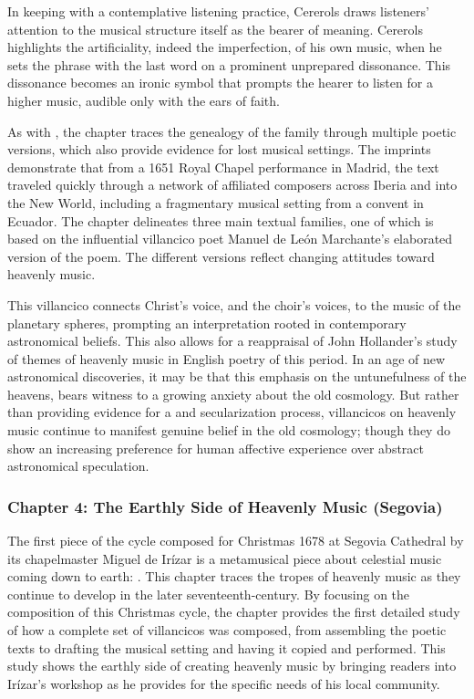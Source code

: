 \documentclass{vcbook-proposal}
\begin{document}
In keeping with a contemplative listening practice, Cererols draws listeners'
attention to the musical structure itself as the bearer of meaning.
Cererols highlights the artificiality, indeed the imperfection, of his own 
music, when he sets the phrase  with 
the last word on a prominent unprepared dissonance.
This dissonance becomes an ironic symbol that prompts the hearer to listen for 
a higher music, audible only with the ears of faith.

As with , the chapter traces the genealogy of the
 family through multiple poetic versions, which
also provide evidence for lost musical settings.
The imprints demonstrate that from a 1651 Royal Chapel performance in Madrid, 
the text traveled quickly through a network of affiliated composers across 
Iberia and into the New World, including a fragmentary musical setting from a 
convent in Ecuador.
The chapter delineates three main textual families, one of which is based on 
the influential villancico poet Manuel de León Marchante's elaborated version 
of the poem. 
The different versions reflect changing attitudes toward heavenly music.

This villancico connects Christ's voice, and the choir's voices, to the music 
of the planetary spheres, prompting an interpretation rooted in contemporary 
astronomical beliefs.
This also allows for a reappraisal of John Hollander's study of themes of
heavenly music in English poetry of this period.%
  \Autocite{Hollander:Untuning}
In an age of new astronomical discoveries, it may be that this emphasis on the 
untunefulness of the heavens, bears witness to a growing anxiety about the old 
cosmology.
But rather than providing evidence for a  and secularization
process, villancicos on heavenly music continue to manifest genuine belief in
the old cosmology; though they do show an increasing preference for human affective
experience over abstract astronomical speculation.


\subsubsection{Chapter 4: The Earthly Side of Heavenly Music (Segovia)}

The first piece of the cycle composed for Christmas 1678 at Segovia Cathedral by
its chapelmaster Miguel de Irízar is a metamusical piece about celestial music
coming down to earth: .
This chapter traces the tropes of heavenly music as they continue to develop in
the later seventeenth-century. 
By focusing on the composition of this Christmas cycle, the chapter
provides the first detailed study of how a complete set of villancicos was
composed, from assembling the poetic texts to drafting the musical setting and
having it copied and performed.
This study shows the earthly side of creating heavenly music by bringing
readers into Irízar's workshop as he provides for the specific needs of his
local community.
\end{document}
